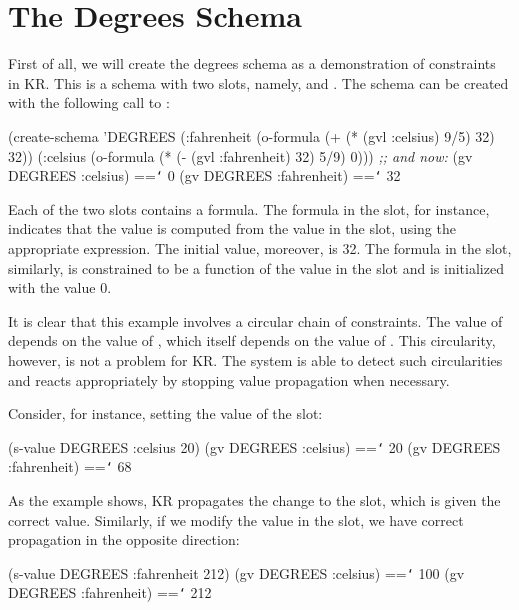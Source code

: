 \section{The Degrees Schema}
\value{s-top}

First of all, we will create the {\sc degrees} schema as a demonstration of constraints in KR.  This is a schema with two
slots, namely,  and .  The schema can be created
with the following call to :
\begin{programexample}
\label{degrees}
(create-schema 'DEGREES
  (:fahrenheit (o-formula (+ (* (gvl :celsius) 9/5) 32)
                          32))
  (:celsius (o-formula (* (- (gvl :fahrenheit) 32) 5/9)
                       0)))
{\it ;; and now:}
(gv DEGREES :celsius)    =={\tt\char`\>} 0
(gv DEGREES :fahrenheit) =={\tt\char`\>} 32

\end{programexample}

Each of the two slots contains a formula.  The formula in the 
slot, for instance, indicates that the value is computed from the value in
the  slot, using the appropriate expression.  The initial
value, moreover, is 32.  The formula in the  slot,
similarly, is constrained to be a function of the value in the 
slot and is initialized with the value 0.

It is clear that this example involves a circular chain of constraints.
The value of  depends on the value of , which
itself depends on the value of .  This circularity, however, is
not a problem for KR.  The system is able to detect such circularities and
reacts appropriately by stopping value propagation when necessary.

Consider, for instance, setting the value of the  slot:
\begin{programexample}
(s-value DEGREES :celsius 20)
(gv DEGREES :celsius)             =={\tt\char`\>} 20
(gv DEGREES :fahrenheit)          =={\tt\char`\>} 68
\end{programexample}

As the example shows, KR propagates the change to the  slot,
which is given the correct value.  Similarly, if we modify the value in the
 slot, we have correct propagation in the opposite
direction:
\begin{programexample}
(s-value DEGREES :fahrenheit 212)
(gv DEGREES :celsius)             =={\tt\char`\>} 100
(gv DEGREES :fahrenheit)          =={\tt\char`\>} 212
\end{programexample}


